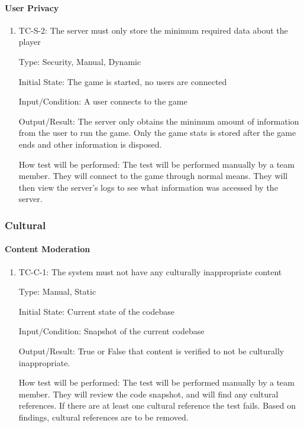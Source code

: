 \documentclass[12pt, titlepage]{article}
\begin{document}
\paragraph{User Privacy}

\begin{enumerate}
\item{TC-S-2: The server must only store the minimum required data about the player}

Type: Security, Manual, Dynamic
					
Initial State: The game is started, no users are connected
					
Input/Condition: A user connects to the game
					
Output/Result: The server only obtains the minimum amount of information from the user to run the game. Only the game stats is stored after the game ends and other information is disposed.
					
How test will be performed: The test will be performed manually by a team member. They will connect to the game through normal means. They will then view the server's logs to see what information was accessed by the server.
\end{enumerate}

\subsubsection{Cultural}

\paragraph{Content Moderation}
\begin{enumerate}
\item{TC-C-1: The system must not have any culturally inappropriate content}

Type: Manual, Static
					
Initial State: Current state of the codebase
					
Input/Condition: Snapshot of the current codebase 
					
Output/Result: True or False that content is verified to not be culturally inappropriate.
					
How test will be performed: The test will be performed manually by a team member. They will review the code snapshot, and will find any cultural references. If there are at least one cultural reference the test fails. Based on findings, cultural references are to be removed.
\end{enumerate}
\end{document}
